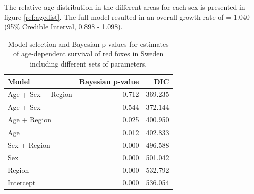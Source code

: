 \documentclass[12pt, a4paper]{article}
\begin{document}
The relative age distribution in the different areas for each sex is presented in figure \ref{ref:agedist}. The full model resulted in an overall growth rate of \lambda = 1.040 (95\% Credible Interval, 0.898 - 1.098).


\begin{table}[!htbp]
  \centering
  \captionsetup{font=scriptsize}
  \caption{Model selection and Bayesian p-values for estimates of age-dependent survival of red foxes in Sweden including different sets of parameters.}
  \label{table:DICBP}
  \scriptsize
  \begin{tabular}{lrr}
    \toprule
    Model              & Bayesian p-value & DIC     \\
    \midrule
    Age + Sex + Region & 0.712            & 369.235 \\
    Age + Sex          & 0.544            & 372.144 \\
    Age + Region       & 0.025            & 400.950 \\
    Age                & 0.012            & 402.833 \\
    Sex + Region       & 0.000            & 496.588 \\
    Sex                & 0.000            & 501.042 \\
    Region             & 0.000            & 532.792 \\
    Intercept          & 0.000            & 536.054 \\
    \bottomrule
  \end{tabular}
\end{table}
\end{document}

